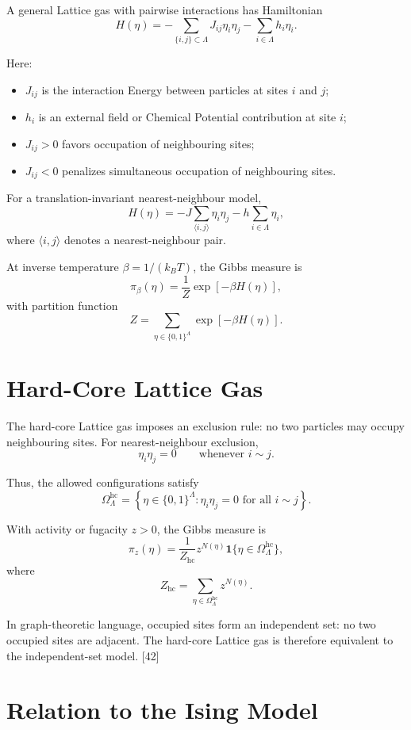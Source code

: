 \documentclass[a4paper, 10pt, onepage]{elegantbook}
\begin{document}
{A general Lattice gas with pairwise interactions has Hamiltonian
\[
H(\eta)
=
-\sum_{\{i,j\}\subset\Lambda}J_{ij}\eta_i\eta_j
-\sum_{i\in\Lambda}h_i\eta_i.
\]

Here:

\begin{itemize}
\item \(J_{ij}\) is the interaction Energy between particles at sites \(i\) and \(j\);
\item \(h_i\) is an external field or Chemical Potential contribution at site \(i\);
\item \(J_{ij}>0\) favors occupation of neighbouring sites;
\item \(J_{ij}<0\) penalizes simultaneous occupation of neighbouring sites.
\end{itemize}

For a translation-invariant nearest-neighbour model,
\[
H(\eta)
=
-J\sum_{\langle i,j\rangle}\eta_i\eta_j
-h\sum_{i\in\Lambda}\eta_i,
\]
where \(\langle i,j\rangle\) denotes a nearest-neighbour pair.

At inverse temperature \(\beta=1/(k_BT)\), the Gibbs measure is
\[
\pi_\beta(\eta)
=
\frac{1}{Z}
\exp[-\beta H(\eta)],
\]
with partition function
\[
Z
=
\sum_{\eta\in\{0,1\}^{\Lambda}}
\exp[-\beta H(\eta)].
\]

\section{Hard-Core Lattice Gas}

The hard-core Lattice gas imposes an exclusion rule: no two particles may occupy
neighbouring sites. For nearest-neighbour exclusion,
\[
\eta_i\eta_j=0
\qquad
\text{whenever } i\sim j.
\]

Thus, the allowed configurations satisfy
\[
\Omega_\Lambda^{\mathrm{hc}}
=
\left\{
\eta\in\{0,1\}^{\Lambda}:
\eta_i\eta_j=0
\text{ for all } i\sim j
\right\}.
\]

With activity or fugacity \(z>0\), the Gibbs measure is
\[
\pi_z(\eta)
=
\frac{1}{Z_{\mathrm{hc}}}
z^{N(\eta)}
\mathbf 1\{\eta\in\Omega_\Lambda^{\mathrm{hc}}\},
\]
where
\[
Z_{\mathrm{hc}}
=
\sum_{\eta\in\Omega_\Lambda^{\mathrm{hc}}}
z^{N(\eta)}.
\]

In graph-theoretic language, occupied sites form an independent set: no two
occupied sites are adjacent. The hard-core Lattice gas is therefore equivalent
to the independent-set model. [42]

\section{Relation to the Ising Model}

}
\end{document}
